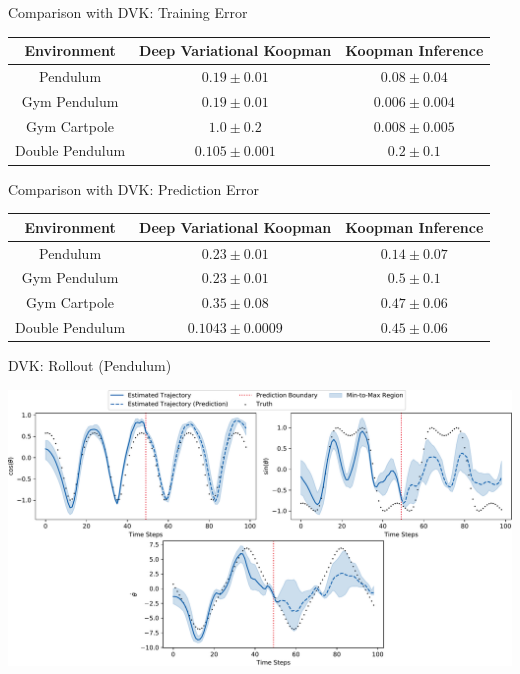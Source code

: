 \documentclass[
	aspectratio=43,
	color={accentcolor=1c},
	logo=false,
	colorframetitle=true,
]{tudabeamer}
\begin{document}
			\begin{frame}[c]{Comparison with DVK: Training Error}
				\begin{table}
					\centering
					\begin{tabular}{c|c|c}
						\textbf{Environment} & \textbf{Deep Variational Koopman} & \textbf{Koopman Inference} \\ \hline
						      Pendulum       &         \(0.19 \pm 0.01\)         &   \(\bm{0.08 \pm 0.04}\)   \\
						    Gym Pendulum     &         \(0.19 \pm 0.01\)         &  \(\bm{0.006 \pm 0.004}\)  \\
						    Gym Cartpole     &          \(1.0 \pm 0.2\)          &  \(\bm{0.008 \pm 0.005}\)  \\
						  Double Pendulum    &     \(\bm{0.105 \pm 0.001}\)      &      \(0.2 \pm 0.1\)
					\end{tabular}
				\end{table}
			\end{frame}

			\begin{frame}[c]{Comparison with DVK: Prediction Error}
				\begin{table}
					\centering
					\begin{tabular}{c|c|c}
						\textbf{Environment} & \textbf{Deep Variational Koopman} & \textbf{Koopman Inference} \\ \hline
						      Pendulum       &         \(0.23 \pm 0.01\)         &   \(\bm{0.14 \pm 0.07}\)   \\
						    Gym Pendulum     &      \(\bm{0.23 \pm 0.01}\)       &      \(0.5 \pm 0.1\)       \\
						    Gym Cartpole     &      \(\bm{0.35 \pm 0.08}\)       &     \(0.47 \pm 0.06\)      \\
						  Double Pendulum    &    \(\bm{0.1043 \pm 0.0009}\)     &     \(0.45 \pm 0.06\)
					\end{tabular}
				\end{table}
			\end{frame}

			\begin{frame}[c]{DVK: Rollout (Pendulum)}
				\begin{center}
					\includegraphics[width=\linewidth]{figures/experiments/morton-predictions.pdf}
				\end{center}
			\end{frame}
\end{document}
